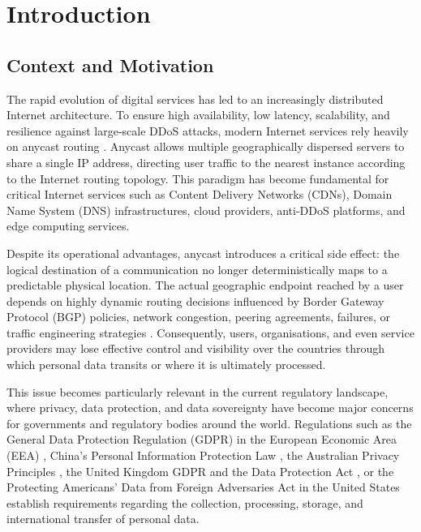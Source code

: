 \chapter{Introduction}
\label{ch:introduction}

\section{Context and Motivation}
\label{sc:introduction_context_motivation}

The rapid evolution of digital services has led to an increasingly distributed Internet architecture. To ensure high availability, low latency, scalability, and resilience against large-scale DDoS attacks, modern Internet services rely heavily on anycast routing \cite{Abley2006OperationServices,McPherson2014ArchitecturalAnycast}. Anycast allows multiple geographically dispersed servers to share a single IP address, directing user traffic to the nearest instance according to the Internet routing topology. This paradigm has become fundamental for critical Internet services such as Content Delivery Networks (CDNs), Domain Name System (DNS) infrastructures, cloud providers, anti-DDoS platforms, and edge computing services.

Despite its operational advantages, anycast introduces a critical side effect: the logical destination of a communication no longer deterministically maps to a predictable physical location. The actual geographic endpoint reached by a user depends on highly dynamic routing decisions influenced by Border Gateway Protocol (BGP) policies, network congestion, peering agreements, failures, or traffic engineering strategies \cite{Calder2015AnalyzingCDN, Zhou2023RegionalPotentials}. Consequently, users, organisations, and even service providers may lose effective control and visibility over the countries through which personal data transits or where it is ultimately processed.

This issue becomes particularly relevant in the current regulatory landscape, where privacy, data protection, and data sovereignty have become major concerns for governments and regulatory bodies around the world. Regulations such as the General Data Protection Regulation (GDPR) in the European Economic Area (EEA) \cite{REGULATIONSRelevance}, China's Personal Information Protection Law \cite{TheTranslation}, the Australian Privacy Principles \cite{ReadOAIC}, the United Kingdom GDPR and the Data Protection Act \cite{RegulationRelevance,Data2018}, or the Protecting Americans' Data from Foreign Adversaries Act in the United States \cite{Rep.Pallone2024Text2024} establish requirements regarding the collection, processing, storage, and international transfer of personal data.

